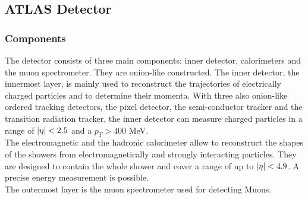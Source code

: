 \documentclass[12pt, a4paper, bibliography=totoc]{scrartcl}
\begin{document}
\begin{multicols}{2}
\subsection{ATLAS Detector}
\subsubsection{Components}
The detector consists of three main components: inner detector, calorimeters and the muon spectrometer.
They are onion-like constructed. 
The inner detector, the innermost layer, is mainly used to reconstruct the trajectories of electrically charged particles and to determine their momenta. 
With three also onion-like ordered tracking detectors, the pixel detector, the semi-conductor tracker and the transition radiation tracker, the inner detector can measure charged particles in a range of $\abs{\eta} < 2.5$ and a $p_{T} > 400$ \si{MeV}.\\

The electromagnetic and the hadronic calorimeter allow to reconstruct the shapes of the showers from electromagnetically and strongly interacting particles. 
They are designed to contain the whole shower and cover a range of up to $\abs{\eta} < 4.9$. 
A precise energy measurement is possible.\\
The outermost layer is the muon spectrometer used for detecting Muons.


\end{multicols}
\end{document}
